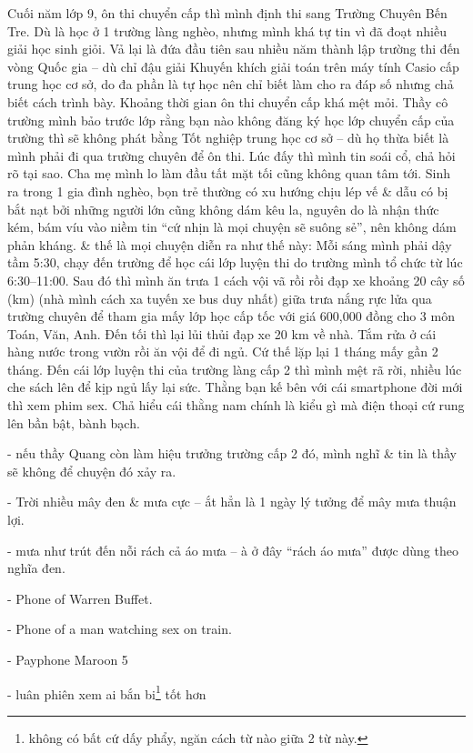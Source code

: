 \documentclass[12pt,oneside]{book}
\begin{document}
Cuối năm lớp 9, ôn thi chuyển cấp thì mình định thi sang Trường Chuyên Bến Tre. Dù là học ở 1 trường làng nghèo, nhưng mình khá tự tin vì đã đoạt nhiều giải học sinh giỏi. Vả lại là đứa đầu tiên sau nhiều năm thành lập trường thi đến vòng Quốc gia -- dù chỉ đậu giải Khuyến khích giải toán trên máy tính Casio cấp trung học cơ sở, do đa phần là tự học nên chỉ biết làm cho ra đáp số nhưng chả biết cách trình bày. Khoảng thời gian ôn thi chuyển cấp khá mệt mỏi. Thầy cô trường mình bảo trước lớp rằng bạn nào không đăng ký học lớp chuyển cấp của trường thì sẽ không phát bằng Tốt nghiệp trung học cơ sở -- dù họ thừa biết là mình phải đi qua trường chuyên để ôn thi. Lúc đấy thì mình tin soái cổ, chả hỏi rõ tại sao. Cha mẹ mình lo làm đầu tất mặt tối cũng không quan tâm tới. Sinh ra trong 1 gia đình nghèo, bọn trẻ thường có xu hướng chịu lép vế \& dẫu có bị bắt nạt bởi những người lớn cũng không dám kêu la, nguyên do là nhận thức kém, bám víu vào niềm tin ``cứ nhịn là mọi chuyện sẽ suông sẻ'', nên không dám phản kháng. \& thế là mọi chuyện diễn ra như thế này: Mỗi sáng mình phải dậy tầm 5:30, chạy đến trường để học cái lớp luyện thi do trường mình tổ chức từ lúc 6:30--11:00. Sau đó thì mình ăn trưa 1 cách vội vã rồi rồi đạp xe khoảng 20 cây số (km) (nhà mình cách xa tuyến xe bus duy nhất) giữa trưa nắng rực lửa qua trường chuyên để tham gia mấy lớp học cấp tốc với giá 600,000 đồng cho 3 môn Toán, Văn, Anh. Đến tối thì lại lủi thủi đạp xe 20 km về nhà. Tắm rửa ở cái hàng nước trong vườn rồi ăn vội để đi ngủ. Cứ thế lặp lại 1 tháng mấy gần 2 tháng. Đến cái lớp luyện thi của trường làng cấp 2 thì mình mệt rã rời, nhiều lúc che sách lên để kịp ngủ lấy lại sức. Thằng bạn kế bên với cái smartphone đời mới thì xem phim sex. Chả hiểu cái thằng nam chính là kiểu gì mà điện thoại cứ rung lên bần bật, bành bạch.

- nếu thầy Quang còn làm hiệu trưởng trường cấp 2 đó, mình nghĩ \& tin là thầy sẽ không để chuyện đó xảy ra.

- Trời nhiều mây đen \& mưa cực -- ắt hẳn là 1 ngày lý tưởng để mây mưa thuận lợi.

- mưa như trút đến nỗi rách cả áo mưa -- à ở đây ``rách áo mưa'' được dùng theo nghĩa đen.

- Phone of Warren Buffet.

- Phone of a man watching sex on train.

- Payphone Maroon 5

- luân phiên xem ai bắn bi\footnote{không có bất cứ dấy phẩy, ngăn cách từ nào giữa 2 từ này.} tốt hơn
\end{document}
